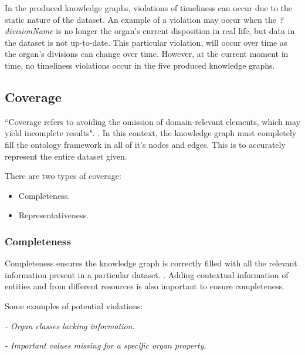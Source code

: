 In the produced knowledge graphs, violations of timeliness can occur due to the static nature of the dataset. An example of a violation may occur when the \textit{?divisionName} is no longer the organ's current disposition in real life, but data in the dataset is not up-to-date. This particular violation, will occur over time as the organ's divisions can change over time. However, at the current moment in time, no timeliness violations occur in the five produced knowledge graphs.

\subsection{Coverage}
\hspace{0.5cm} ``Coverage refers to avoiding the omission of domain-relevant elements, which may yield incomplete results". \cite{knowledgegraphevaulationbook}. In this context, the knowledge graph must completely fill the ontology framework in all of it's nodes and edges. This is to accurately represent the entire dataset given. 

\noindent There are two types of coverage: 

\vspace{-0.15cm}
\begin{itemize}
\itemsep0em 
\item Completeness.
\vspace{-0.1cm}
\item Representativeness.
\end{itemize}
\vspace{-0.4cm}

\subsubsection{Completeness}
\hspace{0.5cm} Completeness ensures the knowledge graph is correctly filled with all the relevant information present in a particular dataset. \cite{knowledgegraphevaulationbook}. Adding contextual information of entities and from different resources \cite{evaluationpaper} is also important to ensure completeness. 

\noindent Some examples of potential violations:

\vspace{-0.15cm}
\begin{displayquote}
    \textit{- Organ classes lacking information.}
\end{displayquote}
\vspace{-0.6cm}
\begin{displayquote}
    \textit{- Important values missing for a specific organ property.}
\end{displayquote}
\vspace{-0.1cm}

